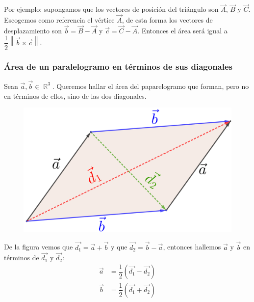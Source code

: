 \documentclass[12pt, fleqn]{report}                             %
\newcommand{\Abs}[1]{\left\lVert #1 \right\lVert}               %
\newcommand{\Wrap}[1]{\left( #1 \right)}                        %
\DeclareMathOperator \Reals        {\mathbb{R}}                 %
\begin{document}
                Por ejemplo: supongamos que los vectores de posición del triángulo son $\vec{A}$, $\vec{B}$ y $\vec{C}$. Escogemos como referencia el vértice $\vec{A}$, de esta forma los vectores de desplazamiento son $\vec{b}=\vec{B}-\vec{A}$ y $\vec{c}=\vec{C}-\vec{A}$. Entonces el área será igual a $\dfrac{1}{2}\Abs{\vec{b} \times \vec{c}}$.
                
                \clearpage
                
                \subsubsection{Área de un paralelogramo en términos de sus diagonales}
                
                Sean $\vec{a}, \vec{b} \in \Reals^3$. Queremos hallar el área del paparelogramo que forman, pero no en términos de ellos, sino de las dos diagonales.
                
                \begin{figure}[H]
                	\centering
                	\includegraphics[scale=1.3]{parallelogram2.png}
                \end{figure}
            	
            	De la figura vemos que $\vec{d_1}=\vec{a}+\vec{b}$ y que $\vec{d_2}=\vec{b}-\vec{a}$, entonces hallemos $\vec{a}$ y $\vec{b}$ en términos de $\vec{d_1}$ y $\vec{d_2}$:
            	\begin{align*}
	            	\vec{a} &= \dfrac{1}{2}\Wrap{\vec{d_1}-\vec{d_2}}\\
	            	\vec{b} &= \dfrac{1}{2}\Wrap{\vec{d_1}+\vec{d_2}}
            	\end{align*}
            	
\end{document}
